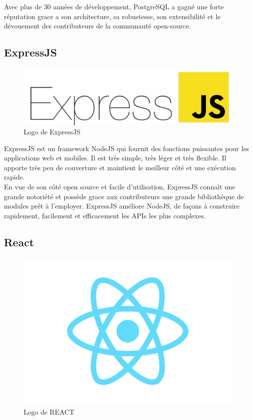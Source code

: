     Avec plus de 30 années de développement, PostgreSQL a gagné une forte réputation grace a son architecture, sa robustesse, son extensibilité et le dévouement des contributeurs de la communauté open-source.\\

    \subsection{ExpressJS\cite{expressjs}}
    \begin{figure}[H]
        \centering
        \includegraphics[scale=0.16]{ACR/ExpressJS-logo.png}
        \caption{Logo de ExpressJS}
    \end{figure}
    
    ExpressJS est un framework NodeJS qui fournit des fonctions puissantes pour les applications web et mobiles. Il est très simple, très léger et très flexible. Il apporte très peu de couverture et maintient le meilleur côté et une exécution rapide.\\

    En vue de son côté open source et facile d'utilisation, ExpressJS connaît une grande notoriété et possède grace aux contributeurs une grande bibliothèque de modules prêt à l'employer. ExpressJS améliore NodeJS, de façons à construire rapidement, facilement et efficacement les APIs les plus complexes.\\ 

    \subsection{React}
    \begin{figure}[H]
        \centering
        \includegraphics[scale=0.16]{ACR/react.png}
        \caption{Logo de REACT}
    \end{figure}

